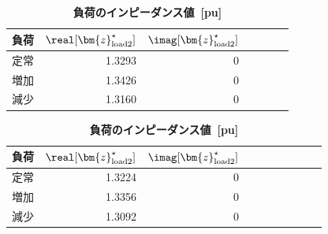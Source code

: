 \documentclass[tombow,dvipdfmx]{corona-a5-1.1}
\begin{document}
\begin{table}[h]
\medskip
 \centering
  {
  \begin{minipage}{0.49\linewidth}
  \caption{\textbf{負荷のインピーダンス値~[pu]}} \label{table:loadpara1}
    \centering
  \begin{tabular}{crrrccc}
   \hline
負荷 &  $\real [\bm{z}_{{\rm load}2}^{\star}]$ & $\imag [\bm{z}_{{\rm load}2}^{\star}]$ \\
   \hline \hline
   定常 & 1.3293 & 0 \\
   増加 & 1.3426 & 0 \\
   減少 & 1.3160 & 0 \\
   \hline
  \end{tabular}
  \end{minipage}
  \begin{minipage}{0.49\linewidth}
  \caption{\textbf{負荷のインピーダンス値~[pu]}} \label{table:loadpara2}
    \centering
  \begin{tabular}{crrrrccccc}
   \hline
負荷 &  $\real [\bm{z}_{{\rm load}2}^{\star}]$ & $\imag [\bm{z}_{{\rm load}2}^{\star}]$ \\
   \hline \hline
   定常 & 1.3224 & 0\\
   増加 & 1.3356 & 0 \\
   減少 & 1.3092 & 0 \\
   \hline
  \end{tabular}
  \end{minipage}
  }
\end{table}
\end{document}
